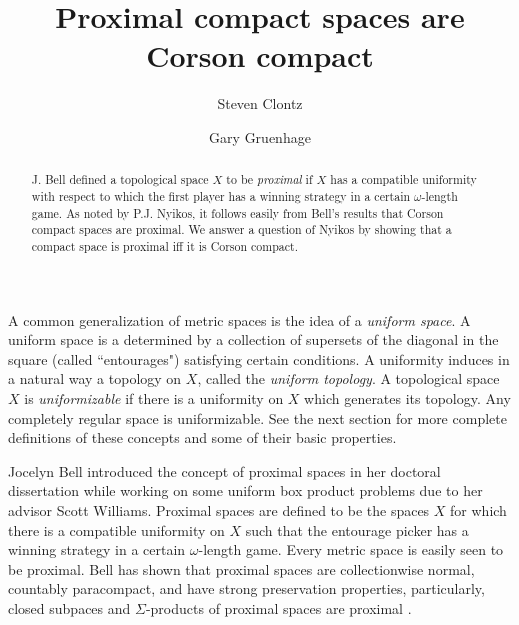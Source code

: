 \documentclass{amsart}
\theoremstyle{definition}
\theoremstyle{remark}
\newcommand{\<}{\langle}
\renewcommand{\>}{\rangle}
\newcommand{\term}{\textit}
\begin{document}
\title{Proximal compact spaces are Corson compact}



\author{Steven Clontz}
\address{Department of Mathematics, Auburn University,
Auburn, AL 36830}

\author{Gary Gruenhage}
\address{Department of Mathematics, Auburn University,
Auburn, AL 36830}




\begin{abstract}

J. Bell defined a topological space $X$ to be \term{proximal} if $X$ has a compatible uniformity with respect to which the first player has a winning strategy in a certain $\omega$-length game.  As noted by P.J. Nyikos, it follows easily from Bell's results that Corson compact spaces are proximal.  We answer a question of Nyikos by showing that a compact space is proximal iff it is Corson compact.
\end{abstract}


\maketitle

A common generalization of metric spaces is the idea of a \term{uniform space}.  A uniform space is a determined by a collection of supersets of the diagonal in the square (called ``entourages")  satisfying certain conditions.  A uniformity induces in a natural way a topology on $X$, called the \term{uniform topology}.  A topological space $X$ is \term{uniformizable} if there is  a uniformity on $X$ which generates its topology.   Any completely regular space is uniformizable.  See the next section for more complete definitions of these concepts and some of their basic properties.

Jocelyn Bell introduced the concept of proximal spaces in her doctoral dissertation while working on some uniform box product problems due to her advisor Scott Williams.  Proximal spaces are defined to be the spaces $X$ for which there is a compatible uniformity on $X$ such that the entourage picker has a winning strategy in a certain $\omega$-length game. Every metric space is easily seen to be proximal. Bell has shown that proximal spaces are collectionwise normal, countably paracompact, and have strong preservation properties, particularly, closed subpaces and  $\Sigma$-products of proximal spaces are  proximal \cite{b}.
\end{document}
